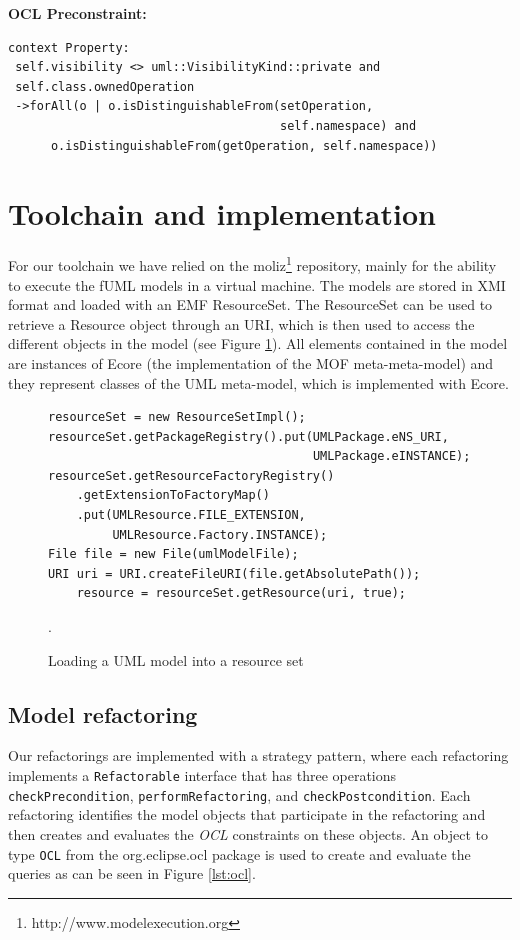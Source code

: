 \documentclass{llncs}
\begin{document}
\textbf{OCL Preconstraint:}
\begin{lstlisting}
context Property:
 self.visibility <> uml::VisibilityKind::private and
 self.class.ownedOperation
 ->forAll(o | o.isDistinguishableFrom(setOperation,
                                      self.namespace) and
      o.isDistinguishableFrom(getOperation, self.namespace))
\end{lstlisting}


\section{Toolchain and implementation}
\label{sec:toolchain}
For our toolchain we have relied on the moliz\footnote{http://www.modelexecution.org} repository, mainly for the ability to execute the fUML 
models in a virtual machine. The models are stored in XMI format and loaded with an EMF ResourceSet. The ResourceSet
can be used to retrieve a Resource object through an URI, which is then used to access the different objects in the model 
(see Figure \ref{lst:resourceset}). All elements contained in the model are instances of Ecore (the implementation of
the MOF meta-meta-model) and they represent classes of the UML meta-model, which is implemented with Ecore.

\begin{figure}
 \begin{lstlisting}
resourceSet = new ResourceSetImpl();
resourceSet.getPackageRegistry().put(UMLPackage.eNS_URI,
                                     UMLPackage.eINSTANCE);
resourceSet.getResourceFactoryRegistry()
    .getExtensionToFactoryMap()
    .put(UMLResource.FILE_EXTENSION,
         UMLResource.Factory.INSTANCE);
File file = new File(umlModelFile);
URI uri = URI.createFileURI(file.getAbsolutePath());
    resource = resourceSet.getResource(uri, true);
 \end{lstlisting}
 \caption{Loading a UML model into a resource set}.
 \label{lst:resourceset}
\end{figure}

\subsection{Model refactoring}
Our refactorings are implemented with a strategy pattern, where each refactoring implements a \lstinline|Refactorable|
interface that has three operations \lstinline|checkPrecondition|, \lstinline|performRefactoring|, and \lstinline|checkPostcondition|. 
Each refactoring identifies the model objects that participate in the refactoring and then creates and evaluates the \textit{OCL} 
constraints on these objects. An object to type \lstinline|OCL| from the org.eclipse.ocl package is used to create and evaluate the 
queries as can be seen in Figure \ref{lst:ocl}.
\end{document}

